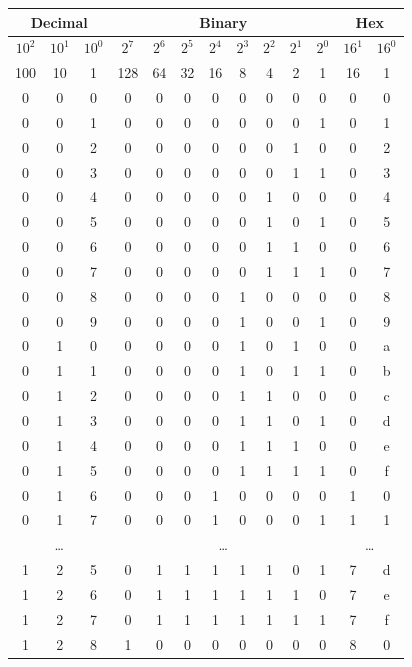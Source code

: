 \begin{figure}[ht]
\begin{center}
\begin{tabular}{|c|c|c||c|c|c|c|c|c|c|c||c|c|}
\hline
\multicolumn{3}{|c||}{Decimal} & \multicolumn{8}{|c||}{Binary} & \multicolumn{2}{|c|}{Hex}\\
\hline
$10^2$	& $10^1$	& $10^0$	& $2^7$ & $2^6$ & $2^5$ & $2^4$ & $2^3$ & $2^2$ & $2^1$ & $2^0$		& $16^1$ & $16^0$	\\
\hline
100		&	10		& 1			& 128	& 64	& 32	& 16	& 8		& 4		& 2		& 1			& 16	& 1			\\
\hline \hline
0		&	0		&	0		& 0 & 0 & 0 & 0 & 0 & 0 & 0 & 0		& 0 & 0 \\
0		&	0		&	1		& 0 & 0 & 0 & 0 & 0 & 0 & 0 & 1		& 0 & 1 \\
0		&	0		&	2		& 0 & 0 & 0 & 0 & 0 & 0 & 1 & 0		& 0 & 2 \\
0		&	0		&	3		& 0 & 0 & 0 & 0 & 0 & 0 & 1 & 1		& 0 & 3 \\
0		&	0		&	4		& 0 & 0 & 0 & 0 & 0 & 1 & 0 & 0		& 0 & 4 \\
0		&	0		&	5		& 0 & 0 & 0 & 0 & 0 & 1 & 0 & 1		& 0 & 5 \\
0		&	0		&	6		& 0 & 0 & 0 & 0 & 0 & 1 & 1 & 0		& 0 & 6 \\
0		&	0		&	7		& 0 & 0 & 0 & 0 & 0 & 1 & 1 & 1		& 0 & 7 \\
0		&	0		&	8		& 0 & 0 & 0 & 0 & 1 & 0 & 0 & 0		& 0 & 8 \\
0		&	0		&	9		& 0 & 0 & 0 & 0 & 1 & 0 & 0 & 1		& 0 & 9 \\
0		&	1		&	0		& 0 & 0 & 0 & 0 & 1 & 0 & 1 & 0		& 0 & a \\
0		&	1		&	1		& 0 & 0 & 0 & 0 & 1 & 0 & 1 & 1		& 0 & b \\
0		&	1		&	2		& 0 & 0 & 0 & 0 & 1 & 1 & 0 & 0		& 0 & c \\
0		&	1		&	3		& 0 & 0 & 0 & 0 & 1 & 1 & 0 & 1		& 0 & d \\
0		&	1		&	4		& 0 & 0 & 0 & 0 & 1 & 1 & 1 & 0		& 0 & e \\
0		&	1		&	5		& 0 & 0 & 0 & 0 & 1 & 1 & 1 & 1		& 0 & f \\
0		&	1		&	6		& 0 & 0 & 0 & 1 & 0 & 0 & 0 & 0		& 1 & 0 \\
0		&	1		&	7		& 0 & 0 & 0 & 1 & 0 & 0 & 0 & 1		& 1 & 1 \\
\hline
\multicolumn{3}{|c||}{\ldots} & \multicolumn{8}{|c||}{\ldots} & \multicolumn{2}{|c|}{\ldots}\\
\hline
1       &   2       &   5		& 0 & 1 & 1 & 1 & 1 & 1 & 0 & 1		& 7 & d \\
1       &   2       &   6		& 0 & 1 & 1 & 1 & 1 & 1 & 1 & 0		& 7 & e \\
1       &   2       &   7		& 0 & 1 & 1 & 1 & 1 & 1 & 1 & 1		& 7 & f \\
1       &   2       &   8		& 1 & 0 & 0 & 0 & 0 & 0 & 0 & 0		& 8 & 0 \\
\hline
\end{tabular}
\end{center}
\label{Figure:integers}
\end{figure}


